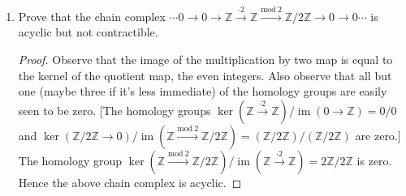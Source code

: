 \documentclass[11pt]{article}
\DeclareMathOperator{\id}{id}
\DeclareMathOperator{\im}{im}
\begin{document}
\begin{enumerate}
\begin{enumerate}
\begin{proof}
            We show that chain complex $\tilde{C}$ is exact at each $\tilde{C}_n$; in particular it suffices to show that $\ker\tilde{\partial}_n\subseteq \im\tilde{\partial}_{n+1}$ so that the homology at each $n$ is trivial. Given $(c,c^\prime)\in \ker\tilde{\partial}_n$ we have $\tilde{\partial}_n(c,c^\prime) = (\partial_n c, \partial_{n+1}c^\prime + (-1)^n c) = (0,0)$. Thus $c = \partial_{n+1} (-1)^{n+1}c^\prime$. 
            
            Then observe that $\tilde{\partial}_{n+1}((-1)^{n+1}c^\prime,0) = (\partial_{n+1}(-1)^{n+1}c^\prime, \partial_{n+2}0 + (-1)^{n+1}(-1)^{n+1}c^\prime) = (c,c^\prime)$. It follows that $\ker\tilde{\partial}_n\subseteq \im\tilde{\partial}_{n+1}$; hence all homology groups are zero and $\tilde{C}$ is acyclic as desired.
        \end{proof}
        \item Prove that $\tilde{C}$ is \textit{contractible} (i.e., the identity map on $\tilde{C}$ is chain homotopic to the zero map, which sends everything to zero). \begin{proof}
            The desired chain homotopy $s\colon \id_{\tilde{C}}\to 0$ is given by the sequence of maps $s_n\colon \tilde{C}_n\to \tilde{C}_{n+1}$ with $s_n(c,c^\prime) = ((-1)^nc^\prime,0)$ (and $s_n$ is clearly a homomorphism for all $n$):

            For $(c,c^\prime)\in \tilde{C}_n$ we have $\tilde{\partial}_{n+1}s_n(c,c^\prime) + s_{n-1}\tilde{\partial}_n(c,c^\prime) = (\partial_{n+1}(-1)^nc^\prime, (-1)^{n+1}(-1)^nc^\prime) + (\partial_{n+1}(-1)^{n-1}c^\prime + (-1)^{n-1}(-1)^n c,0) = -(c,c^\prime) = 0-\id_{\tilde{C}}(c,c^\prime)$. Thus the identity map on $\tilde{C}$ is chain homotopic to the zero map, and so $\tilde{C}$ is contractible as desired.
        \end{proof}
    \end{enumerate}
    \item Prove that the chain complex $\cdots 0\to 0\to \mathbb{Z}\xrightarrow{\cdot 2}\mathbb{Z}\xrightarrow{\mathrm{mod}\ 2} \mathbb{Z}/2\mathbb{Z}\to 0\to 0\cdots$ is acyclic but not contractible.\begin{proof}
        Observe that the image of the multiplication by two map is equal to the kernel of the quotient map, the even integers. Also observe that all but one (maybe three if it's less immediate) of the homology groups are easily seen to be zero. [The homology groups $\ker (\mathbb{Z}\xrightarrow{\cdot 2}\mathbb{Z})/\im (0\to \mathbb{Z}) = 0/0$ and $\ker (\mathbb{Z}/2\mathbb{Z}\to 0)/\im (\mathbb{Z}\xrightarrow{\mathrm{mod}\ 2} \mathbb{Z}/2\mathbb{Z}) = (\mathbb{Z}/2\mathbb{Z})/(\mathbb{Z}/2\mathbb{Z})$ are zero.] The homology group $\ker(\mathbb{Z}\xrightarrow{\mathrm{mod}\ 2} \mathbb{Z}/2\mathbb{Z})/\im(\mathbb{Z}\xrightarrow{\cdot 2}\mathbb{Z}) = 2\mathbb{Z}/2\mathbb{Z}$ is zero. Hence the above chain complex is acyclic.


\end{proof}
\end{enumerate}
\end{document}
